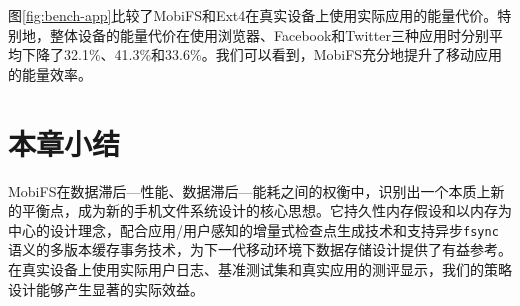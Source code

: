 图\ref{fig:bench-app}比较了MobiFS和Ext4在真实设备上使用实际应用的能量代价。特别地，整体设备的能量代价在使用浏览器、Facebook和Twitter三种应用时分别平均下降了32.1\%、41.3\%和33.6\%。我们可以看到，MobiFS充分地提升了移动应用的能量效率。

\section{本章小结}

MobiFS在数据滞后—性能、数据滞后—能耗之间的权衡中，识别出一个本质上新的平衡点，成为新的手机文件系统设计的核心思想。它持久性内存假设和以内存为中心的设计理念，配合应用/用户感知的增量式检查点生成技术和支持异步\texttt{fsync}语义的多版本缓存事务技术，为下一代移动环境下数据存储设计提供了有益参考。在真实设备上使用实际用户日志、基准测试集和真实应用的测评显示，我们的策略设计能够产生显著的实际效益。

